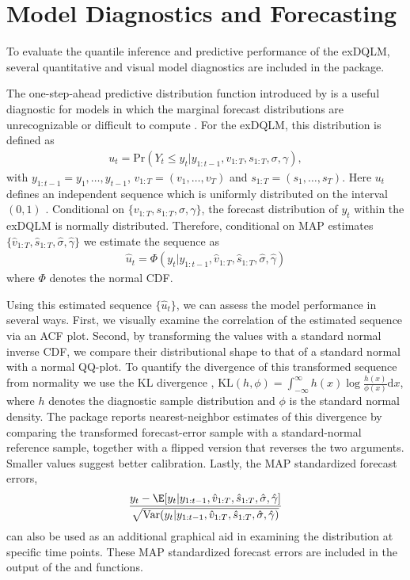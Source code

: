 \documentclass[jss]{jss}
\begin{document}
\section{Model Diagnostics and Forecasting}
\label{sec:diags}

To evaluate the quantile inference and predictive performance of the exDQLM, several quantitative and visual model diagnostics are included in the package.

The one-step-ahead predictive distribution function introduced by \cite{rosenblatt1952remarks} is a useful diagnostic for models in which the marginal forecast distributions are unrecognizable or difficult to compute \citep{huerta2003time,prado2006multivariate}. For the exDQLM, this distribution is defined as
\begin{align}
u_t = \text{Pr}(Y_t \leq y_t |y_{1:t-1},v_{1:T},s_{1:T},\sigma,\gamma), %
\end{align}
with $y_{1:t-1} =y_1,\dots,y_{t-1}$, $v_{1:T}= (v_1,\dots,v_T)$ and $s_{1:T}= (s_1,\dots,s_T)$. Here $u_t$ defines an independent sequence which is uniformly distributed on the interval $(0,1)$ \citep{rosenblatt1952remarks}. Conditional on $\{v_{1:T},s_{1:T},\sigma,\gamma\}$, the forecast distribution of $y_t$ within the exDQLM is normally distributed. Therefore, conditional on MAP estimates $\{\hat{v}_{1:T},\hat{s}_{1:T},\hat\sigma,\hat\gamma\}$ we estimate the sequence as
\begin{align}
\hat{u}_t = \Phi(y_t| y_{1:t-1},\hat{v}_{1:T},\hat{s}_{1:T},\hat\sigma,\hat\gamma)
\end{align}
where $\Phi$ denotes the normal CDF.

Using this estimated sequence $\{\hat u_t\}$, we can assess the model performance in several ways. First, we visually examine the correlation of the estimated sequence via an ACF plot. Second, by transforming the values with a standard normal inverse CDF, we compare their distributional shape to that of a standard normal with a normal QQ-plot. To quantify the divergence of this transformed sequence from normality we use the KL divergence \citep{kullback1951information}, $\text{KL}(h,\phi) = \int_{-\infty}^{\infty} h(x)\log \frac{h(x)}{\phi(x)}\mathrm{d}x$, where $h$ denotes the diagnostic sample distribution and $\phi$ is the standard normal density. The package reports nearest-neighbor estimates of this divergence by comparing the transformed forecast-error sample with a standard-normal reference sample, together with a flipped version that reverses the two arguments. Smaller values suggest better calibration. Lastly, the MAP standardized forecast errors,
\begin{align}
\frac{y_t-\E[y_t | y_{1:t-1},\hat{v}_{1:T},\hat{s}_{1:T},\hat\sigma,\hat\gamma]}{\sqrt{\text{Var}(y_t|y_{1:t-1},\hat{v}_{1:T},\hat{s}_{1:T},\hat\sigma,\hat\gamma)}}
\end{align}
can also be used as an additional graphical aid in examining the distribution at specific time points. These MAP standardized forecast errors are included in the output of the  and  functions.
\end{document}
